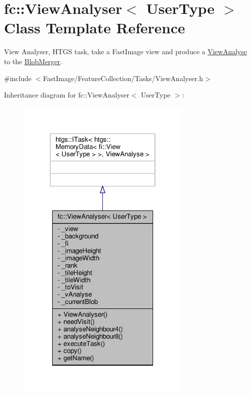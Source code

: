 \hypertarget{classfc_1_1ViewAnalyser}{}\section{fc\+:\+:View\+Analyser$<$ User\+Type $>$ Class Template Reference}
\label{classfc_1_1ViewAnalyser}


View Analyser, H\+T\+GS task, take a Fast\+Image view and produce a \hyperlink{classfc_1_1ViewAnalyse}{View\+Analyse} to the \hyperlink{classfc_1_1BlobMerger}{Blob\+Merger}.  




{\ttfamily \#include $<$Fast\+Image/\+Feature\+Collection/\+Tasks/\+View\+Analyser.\+h$>$}



Inheritance diagram for fc\+:\+:View\+Analyser$<$ User\+Type $>$\+:
\nopagebreak
\begin{figure}[H]
\begin{center}
\leavevmode
\includegraphics[width=238pt]{dc/dc1/classfc_1_1ViewAnalyser__inherit__graph}
\end{center}
\end{figure}


